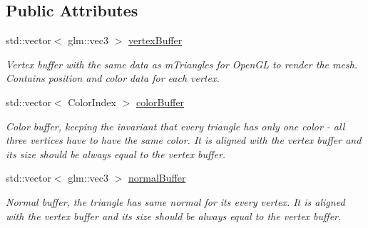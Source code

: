 \subsection*{Public Attributes}
\begin{DoxyCompactItemize}
\item 
\mbox{\label{structpepr3d_1_1_geometry_1_1_open_gl_data_ae087e1484346b1ef7af7f04e6d745745}} 
std\+::vector$<$ glm\+::vec3 $>$ \mbox{\hyperlink{structpepr3d_1_1_geometry_1_1_open_gl_data_ae087e1484346b1ef7af7f04e6d745745}{vertex\+Buffer}}
\begin{DoxyCompactList}\small\item\em Vertex buffer with the same data as m\+Triangles for Open\+GL to render the mesh. Contains position and color data for each vertex. \end{DoxyCompactList}\item 
\mbox{\label{structpepr3d_1_1_geometry_1_1_open_gl_data_a5741e251aec5d181e48fbf2d9e56112d}} 
std\+::vector$<$ Color\+Index $>$ \mbox{\hyperlink{structpepr3d_1_1_geometry_1_1_open_gl_data_a5741e251aec5d181e48fbf2d9e56112d}{color\+Buffer}}
\begin{DoxyCompactList}\small\item\em Color buffer, keeping the invariant that every triangle has only one color -\/ all three vertices have to have the same color. It is aligned with the vertex buffer and its size should be always equal to the vertex buffer. \end{DoxyCompactList}\item 
\mbox{\label{structpepr3d_1_1_geometry_1_1_open_gl_data_ab1e3327043c8d4e8924495db62eb2ad9}} 
std\+::vector$<$ glm\+::vec3 $>$ \mbox{\hyperlink{structpepr3d_1_1_geometry_1_1_open_gl_data_ab1e3327043c8d4e8924495db62eb2ad9}{normal\+Buffer}}
\begin{DoxyCompactList}\small\item\em Normal buffer, the triangle has same normal for its every vertex. It is aligned with the vertex buffer and its size should be always equal to the vertex buffer. \end{DoxyCompactList}\item 
\mbox{\label{structpepr3d_1_1_geometry_1_1_open_gl_data_ad66b73ae688939f518a57411a9f02671}} 

\end{DoxyCompactItemize}
